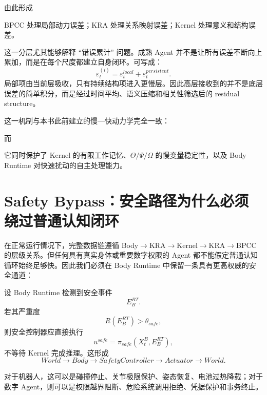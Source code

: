 由此形成
\begin{statementbox}
\centering
{}
\end{statementbox}
BPCC 处理局部动力误差；KRA 处理关系映射误差；Kernel 处理意义和结构误差。

这一分层尤其能够解释 ``错误累计'' 问题。成熟 Agent 并不是让所有误差不断向上累加，而是在每个尺度都建立自身闭环。可写成：
\[
\varepsilon^{(i)}_t
=
\varepsilon^{local}_t
+
\varepsilon^{persistent}_t .
\]
局部项由当前层吸收，只有持续结构项进入更慢层。因此高层接收到的并不是底层误差的简单积分，而是经过时间平均、语义压缩和相关性筛选后的 residual structure。

这一机制与本书此前建立的慢—快动力学完全一致：
\begin{statementbox}
\centering
{}
\end{statementbox}
而
\begin{statementbox}
\centering
{}
\end{statementbox}
它同时保护了 Kernel 的有限工作记忆、$\Theta/\Psi/\Omega$ 的慢变量稳定性，以及 Body Runtime 对快速扰动的自主处理能力。


\section{Safety Bypass：安全路径为什么必须绕过普通认知闭环}

在正常运行情况下，完整数据链遵循 Body$\rightarrow$KRA$\rightarrow$Kernel$\rightarrow$KRA$\rightarrow$BPCC 的层级关系。但任何具有真实身体或重要数字权限的 Agent 都不能假定普通认知循环始终足够快。因此我们必须在 Body Runtime 中保留一条具有更高权威的安全通道：
\begin{statementbox}
\centering
{}
\end{statementbox}

设 Body Runtime 检测到安全事件
\[
E^{RT}_B .
\]
若其严重度
\[
R(E^{RT}_B)
>
\theta_{safe},
\]
则安全控制器应直接执行
\[
u^{safe}
=
\pi_{safe}
\left(
X^B_t,
E^{RT}_B
\right),
\]
不等待 Kernel 完成推理。这形成
\[
World
\rightarrow
Body
\rightarrow
SafetyController
\rightarrow
Actuator
\rightarrow
World .
\]

对于机器人，这可以是碰撞停止、关节极限保护、姿态恢复、电池过热降载；对于数字 Agent，则可以是权限越界阻断、危险系统调用拒绝、凭据保护和事务终止。

